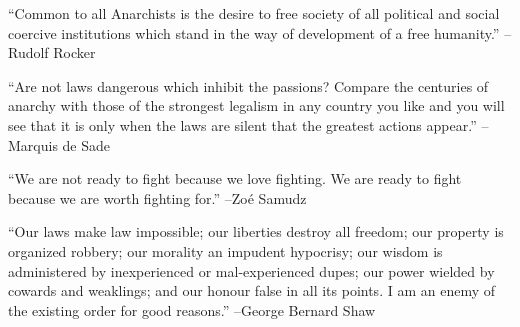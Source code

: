 \documentclass{article}%
\begin{document}
\linebreak%
\vspace{1mm}%
\begin{minipage}{\textwidth}%
\flushleft%
“Common to all Anarchists is the desire to free society of all political and social coercive institutions which stand in the way of development of a free humanity.”%
\linebreak%
\vspace{1mm}%
–Rudolf Rocker%
\linebreak%
\vspace{1mm}%
\end{minipage}%
\linebreak%
\vspace{1mm}%
\begin{minipage}{\textwidth}%
\flushleft%
“Are not laws dangerous which inhibit the passions? Compare the centuries of anarchy with those of the strongest legalism in any country you like and you will see that it is only when the laws are silent that the greatest actions appear.”%
\linebreak%
\vspace{1mm}%
–Marquis de Sade%
\linebreak%
\vspace{1mm}%
\end{minipage}%
\linebreak%
\vspace{1mm}%
\begin{minipage}{\textwidth}%
\flushleft%
“We are not ready to fight because we love fighting. We are ready to fight because we are worth fighting for.”%
\linebreak%
\vspace{1mm}%
–Zoé Samudz%
\linebreak%
\vspace{1mm}%
\end{minipage}%
\linebreak%
\vspace{1mm}%
\begin{minipage}{\textwidth}%
\flushleft%
“Our laws make law impossible; our liberties destroy all freedom; our property is organized robbery; our morality an impudent hypocrisy; our wisdom is administered by inexperienced or mal{-}experienced dupes; our power wielded by cowards and weaklings; and our honour false in all its points. I am an enemy of the existing order for good reasons.”%
\linebreak%
\vspace{1mm}%
–George Bernard Shaw%
\linebreak%
\vspace{1mm}%
\end{minipage}%
\end{document}
